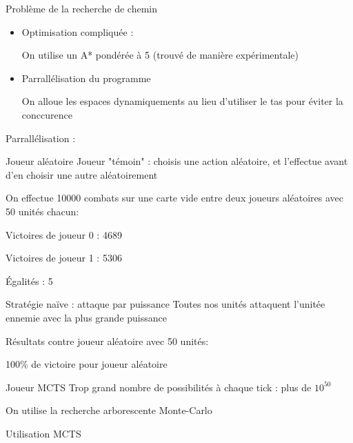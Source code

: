 \documentclass[french]{beamer}
\begin{document}
\begin{frame}{Problème de la recherche de chemin}
	\begin{itemize}
		\item Optimisation compliquée :
		
		On utilise un A* pondérée à 5 (trouvé de manière expérimentale)
		
		\item Parrallélisation du programme
		
		On alloue les espaces dynamiquements au lieu d'utiliser le tas pour éviter la conccurence
	\end{itemize}
Parrallélisation :
\end{frame}
\begin{frame}{Joueur aléatoire}
	Joueur "témoin" : choisis une action aléatoire, et l'effectue avant d'en choisir une autre aléatoirement
	\vspace*{1em}
	
	On effectue 10000 combats sur une carte vide entre deux joueurs aléatoires avec 50 unités chacun:
	\vspace*{1em}
	
	Victoires de joueur 0 : 4689
	
	Victoires de joueur 1 : 5306
	
	Égalités : 5
\end{frame}
\begin{frame}{Stratégie naïve : attaque par puissance}
	Toutes nos unités attaquent l'unitée ennemie avec la plus grande puissance
	
	Résultats contre joueur aléatoire avec 50 unités:
	
	100\% de victoire pour joueur aléatoire
\end{frame}
\begin{frame}{Joueur MCTS}
	Trop grand nombre de possibilités à chaque tick : plus de $10^50$
	
	On utilise la recherche arborescente Monte-Carlo
\end{frame}
\begin{frame}{Utilisation MCTS}
\begin{center}
\scriptsize
{}
\end{center}
\end{frame}
\end{document}
